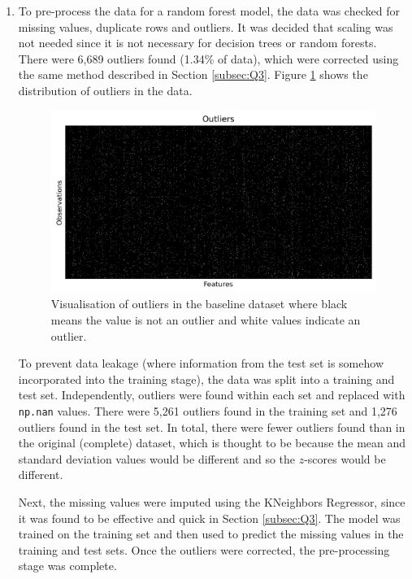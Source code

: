 \documentclass{article}
\begin{document}
\begin{enumerate}[label=\alph*)]
    \item To pre-process the data for a random forest model, the data was checked for missing values, duplicate rows and outliers. It was decided that scaling was not needed since it is not necessary for decision trees or random forests. There were 6,689 outliers found (1.34\% of data), which were corrected using the same method described in Section \ref{subsec:Q3}. Figure \ref{fig:Q4b_outliers} shows the distribution of outliers in the data.
    \begin{figure}[!htb]
        \centering
        \includegraphics[width=\textwidth]{Q4b_outliers.png}
        \caption{Visualisation of outliers in the baseline dataset where black means the value is not an outlier and white values indicate an outlier.}
        \label{fig:Q4b_outliers}
    \end{figure}

    To prevent data leakage (where information from the test set is somehow incorporated into the training stage), the data was split into a training and test set. Independently, outliers were found within each set and replaced with \verb|np.nan| values. There were 5,261 outliers found in the training set and 1,276 outliers found in the test set. In total, there were fewer outliers found than in the original (complete) dataset, which is thought to be because the mean and standard deviation values would be different and so the $z$-scores would be different.

    Next, the missing values were imputed using the KNeighbors Regressor, since it was found to be effective and quick in Section \ref{subsec:Q3}. The model was trained on the training set and then used to predict the missing values in the training and test sets. Once the outliers were corrected, the pre-processing stage was complete.


\end{enumerate}
\end{document}

